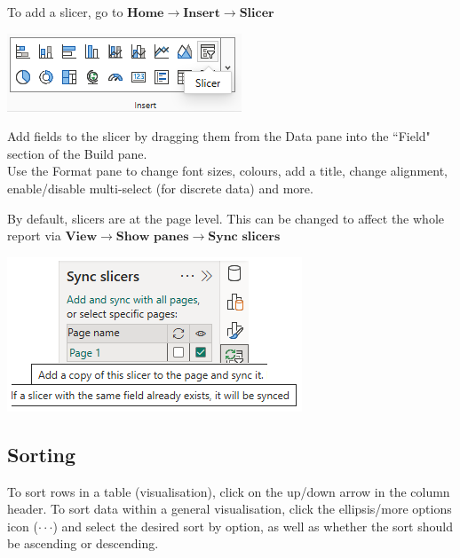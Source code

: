 \documentclass[10pt, openany, twocolumn]{book}
\begin{document}
To add a slicer, go to $\textbf{Home} \rightarrow \textbf{Insert} \rightarrow \textbf{Slicer}$
\begin{center}
    \includegraphics[]{images/slicer.png}
\end{center}

Add fields to the slicer by dragging them from the Data pane into the ``Field" section of the Build pane.\\

Use the Format pane to change font sizes, colours, add a title, change alignment, enable/disable multi-select (for discrete data) and more.

\begin{tcolorbox}[colback=yellow!2!white, colframe=yellow!60!gray]
By default, slicers are at the page level. This can be changed to affect the whole report via $\textbf{View} \rightarrow \textbf{Show panes} \rightarrow \textbf{Sync slicers}$
\begin{center}
    \includegraphics[width=0.9\columnwidth]{images/sync_slicer.png}
\end{center}
\end{tcolorbox}

\subsection*{Sorting}

To sort rows in a table (visualisation), click on the up/down arrow in the column header. To sort data within a general visualisation, click the ellipsis/more options icon ($\cdot \cdot \cdot$) and select the desired sort by option, as well as whether the sort should be ascending or descending. \\
\end{document}
